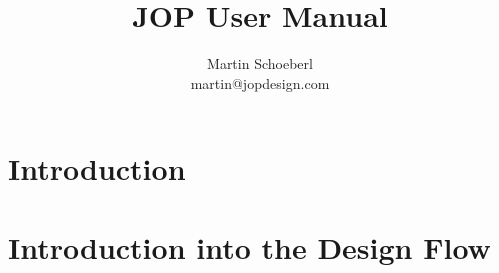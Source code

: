 





\title{JOP User Manual}
\author{Martin Schoeberl\\martin@jopdesign.com}
\maketitle \thispagestyle{empty}

%


%


\tableofcontents \cleardoublepage





\chapter{Introduction}
\label{chap:intro}
%    


\chapter{Introduction into the Design Flow}
\label{chap:build}







\appendix

%    

